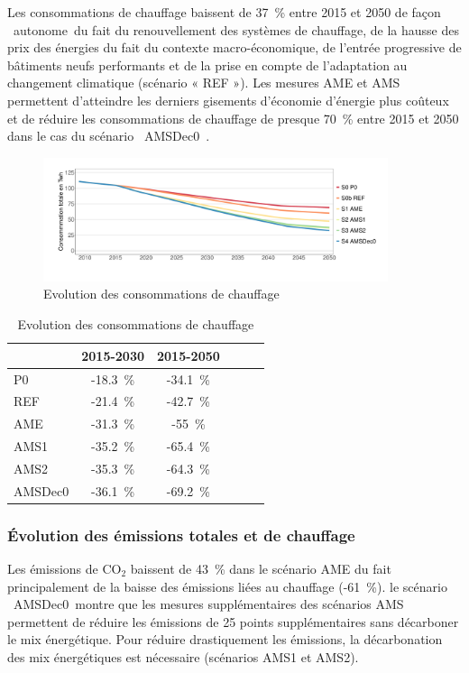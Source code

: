 \documentclass[10.5pt,a4paper]{article}
\begin{document}
{Les consommations de chauffage baissent de 37~\% entre 2015 et 2050  de façon \og~autonome~\fg du fait du renouvellement des systèmes de chauffage, de la hausse des prix des énergies du fait du contexte macro-économique, de l’entrée progressive de bâtiments neufs performants et de la prise en compte de l’adaptation au changement climatique (scénario « REF »). Les mesures AME et AMS permettent d'atteindre les derniers gisements d’économie d’énergie plus coûteux et de réduire les consommations de chauffage de presque 70~\% entre 2015 et 2050 dans le cas du scénario \og~AMSDec0~\fg.

\begin{figure}[h!]
\centering 
\caption{Evolution des consommations de chauffage}\label{Evol_Conso_chauffage-1}  
\includegraphics[width = 0.9\textwidth]{Evol_Conso_chauffage-1}  
\end{figure}

\begin{table}[h!] \caption{Evolution des consommations de chauffage}
\centering
\begin{tabular}[c]{|l|c|c|c|c|c|}
\hline
				& 	2015-2030  &2015-2050 \\
				\hline
P0  		&		-18.3~\%  & 	-34.1~\% \\
REF  		&		-21.4~\% 	& -42.7~\% \\
AME  		&		-31.3~\%  & -55~\% \\
AMS1  	&		-35.2~\%  & -65.4~\% \\
AMS2  	&		-35.3~\%  & -64.3~\% \\
AMSDec0 & 	-36.1~\%  & -69.2~\% \\
\hline
\end{tabular}
\end{table}

\clearpage

\subsubsection{Évolution des émissions totales et de chauffage}

Les émissions de CO$_2$ baissent de 43~\% dans le scénario AME du fait principalement de la baisse des émissions liées au chauffage (-61~\%). le scénario \og~AMSDec0~\fg montre que les mesures supplémentaires des scénarios AMS permettent de réduire les émissions de 25 points supplémentaires sans décarboner le mix énergétique. Pour réduire drastiquement les émissions, la décarbonation des mix énergétiques est nécessaire (scénarios AMS1 et AMS2). 


}
\end{document}
